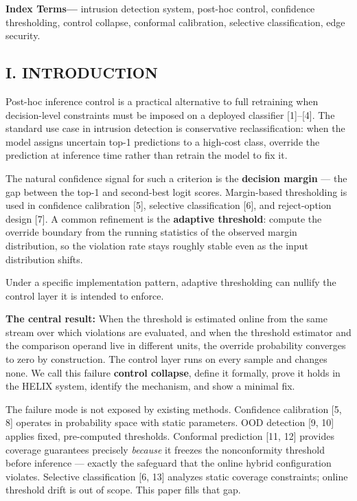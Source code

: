 \documentclass[
  conference]{IEEEtran}
\newcounter{none} %
\begin{document}
\textbf{Index Terms---} intrusion detection system, post-hoc control,
confidence thresholding, control collapse, conformal calibration,
selective classification, edge security.

\subsection{I. INTRODUCTION}\label{i.-introduction}

Post-hoc inference control is a practical alternative to full retraining
when decision-level constraints must be imposed on a deployed classifier
{[}1{]}--{[}4{]}. The standard use case in intrusion detection is
conservative reclassification: when the model assigns uncertain top-1
predictions to a high-cost class, override the prediction at inference
time rather than retrain the model to fix it.

The natural confidence signal for such a criterion is the
\textbf{decision margin} --- the gap between the top-1 and second-best
logit scores. Margin-based thresholding is used in confidence
calibration {[}5{]}, selective classification {[}6{]}, and reject-option
design {[}7{]}. A common refinement is the \textbf{adaptive threshold}:
compute the override boundary from the running statistics of the
observed margin distribution, so the violation rate stays roughly stable
even as the input distribution shifts.

Under a specific implementation pattern, adaptive thresholding can
nullify the control layer it is intended to enforce.

\textbf{The central result:} When the threshold is estimated online from
the same stream over which violations are evaluated, and when the
threshold estimator and the comparison operand live in different units,
the override probability converges to zero by construction. The control
layer runs on every sample and changes none. We call this failure
\textbf{control collapse}, define it formally, prove it holds in the
HELIX system, identify the mechanism, and show a minimal fix.

The failure mode is not exposed by existing methods. Confidence
calibration {[}5, 8{]} operates in probability space with static
parameters. OOD detection {[}9, 10{]} applies fixed, pre-computed
thresholds. Conformal prediction {[}11, 12{]} provides coverage
guarantees precisely \emph{because} it freezes the nonconformity
threshold before inference --- exactly the safeguard that the online
hybrid configuration violates. Selective classification {[}6, 13{]}
analyzes static coverage constraints; online threshold drift is out of
scope. This paper fills that gap.
\end{document}
